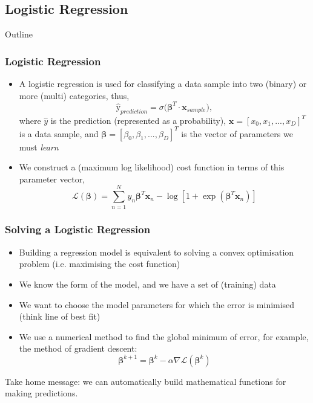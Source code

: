 \documentclass{beamer}
\begin{document}
\subsection{Logistic Regression}


\begin{frame}[noframenumbering]{Outline}
\tableofcontents[currentsubsection]
\end{frame}


\begin{frame}
\frametitle{Logistic Regression}
\begin{itemize}
\item A logistic regression is used for classifying a data sample into two (binary) or more (multi) categories, thus,
$$\hat{\text{y}}_{prediction} = \sigma\big(\boldsymbol\beta^{T} \cdot \boldsymbol{x}_{sample}\big),$$
where $\hat{y}$ is the prediction (represented as a probability), $\boldsymbol{x} = [x_0, x_1, ..., x_D]^T$ is a data sample, and $\boldsymbol\beta = [\beta_0, \beta_1, ..., \beta_D]^T$ is the vector of parameters we must \emph{learn}
\item We construct a (maximum log likelihood) cost function in terms of this parameter vector,
$$\mathcal{L}(\boldsymbol\beta) = \sum_{n=1}^N y_n\boldsymbol\beta^T\boldsymbol{x}_n - \log[1 + \exp(\boldsymbol\beta^T\boldsymbol{x}_n)]$$
\end{itemize}
\end{frame}


\begin{frame}
\frametitle{Solving a Logistic Regression}\begin{itemize}
\item Building a regression model is equivalent to solving a convex optimisation problem (i.e. maximising the cost function)
\item We know the form of the model, and we have a set of (training) data
\item We want to choose the model parameters for which the error is minimised (think line of best fit)
\item We use a numerical method to find the global minimum of error, for example, the method of gradient descent:
$$\boldsymbol\beta^{k+1} = \boldsymbol\beta^{k} - \alpha\nabla\mathcal{L}(\boldsymbol\beta^{k})$$
\end{itemize}
Take home message: we can automatically build mathematical functions for making predictions.
\end{frame}
\end{document}
